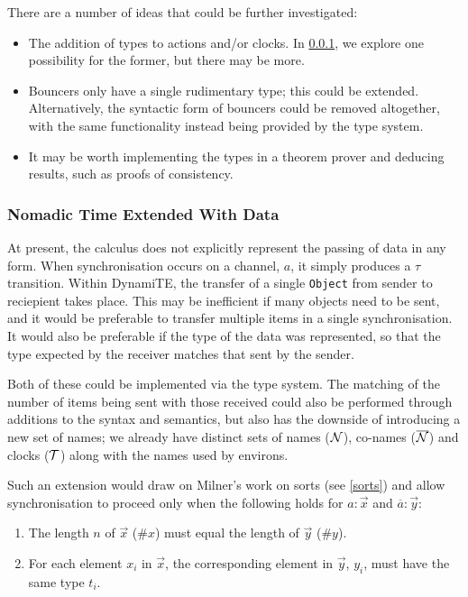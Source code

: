 There are a number of ideas that could be further investigated:

\begin{itemize}
\item The addition of types to actions and/or clocks.  In \ref{tnted},
  we explore one possibility for the former, but there may be more.
\item Bouncers only have a single rudimentary type; this could be
  extended.  Alternatively, the syntactic form of bouncers could be
  removed altogether, with the same functionality instead being
  provided by the type system.
\item It may be worth implementing the types in a theorem prover and
  deducing results, such as proofs of consistency.
\end{itemize}

\subsubsection{Nomadic Time Extended With Data}
\label{tnted}

At present, the calculus does not explicitly represent the passing of
data in any form.  When synchronisation occurs on a channel, $a$, it
simply produces a $\tau$ transition.  Within DynamiTE, the transfer of
a single \texttt{Object} from sender to reciepient takes place.  This
may be inefficient if many objects need to be sent, and it would be
preferable to transfer multiple items in a single synchronisation.  It
would also be preferable if the type of the data was represented, so
that the type expected by the receiver matches that sent by the
sender.

Both of these could be implemented via the type system.  The matching
of the number of items being sent with those received could also be
performed through additions to the syntax and semantics, but also has
the downside of introducing a new set of names; we already have
distinct sets of names ($\text{$\mathcal{N}$}$), co-names ($\text{$\overline{\text{$\mathcal{N}$}}$}$) and clocks
($\text{$\mathcal{T}$}$) along with the names used by environs.

Such an extension would draw on Milner's work on sorts (see
\ref{sorts}) and allow synchronisation to proceed only when the
following holds for $a : \vec{x}$ and $\overline{a} : \vec{y}$:

\begin{enumerate}
\item The length $n$ of $\vec{x}$ ($\#x$) must equal the length of
  $\vec{y}$ ($\#y$).
\item For each element $x_i$ in $\vec{x}$, the corresponding element
  in $\vec{y}$, $y_i$, must have the same type $t_i$.
\end{enumerate}

